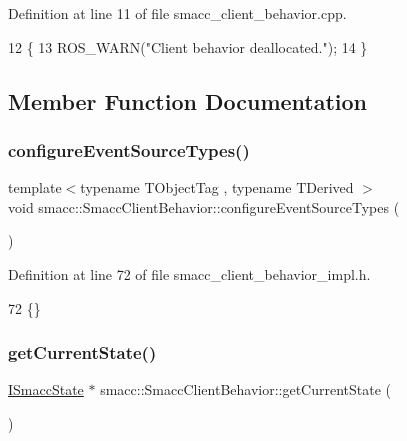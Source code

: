 Definition at line 11 of file smacc\+\_\+client\+\_\+behavior.\+cpp.


\begin{DoxyCode}
12     \{
13         ROS\_WARN(\textcolor{stringliteral}{"Client behavior deallocated."});
14     \}
\end{DoxyCode}


\subsection{Member Function Documentation}
\mbox{\label{classsmacc_1_1SmaccClientBehavior_a532a84b947599545a9955949c3b76648}} 
\subsubsection{\texorpdfstring{configure\+Event\+Source\+Types()}{configureEventSourceTypes()}}
{\footnotesize\ttfamily template$<$typename T\+Object\+Tag , typename T\+Derived $>$ \\
void smacc\+::\+Smacc\+Client\+Behavior\+::configure\+Event\+Source\+Types (\begin{DoxyParamCaption}{ }\end{DoxyParamCaption})\hspace{0.3cm}{\ttfamily [private]}}



Definition at line 72 of file smacc\+\_\+client\+\_\+behavior\+\_\+impl.\+h.


\begin{DoxyCode}
72 \{\}
\end{DoxyCode}
\mbox{\label{classsmacc_1_1SmaccClientBehavior_abf6773e4dd948f932f11a346dd6e7c2c}} 
\subsubsection{\texorpdfstring{get\+Current\+State()}{getCurrentState()}}
{\footnotesize\ttfamily \hyperlink{classsmacc_1_1ISmaccState}{I\+Smacc\+State} $\ast$ smacc\+::\+Smacc\+Client\+Behavior\+::get\+Current\+State (\begin{DoxyParamCaption}{ }\end{DoxyParamCaption})\hspace{0.3cm}{\ttfamily [inline]}}



